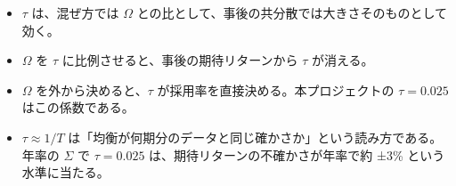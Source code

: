 \begin{keybox}[この章のまとめ]
\begin{itemize}
\item $\tau$ は、混ぜ方では $\Omega$ との比として、事後の共分散では大きさそのものとして効く。
\item $\Omega$ を $\tau$ に比例させると、事後の期待リターンから $\tau$ が消える。
\item $\Omega$ を外から決めると、$\tau$ が採用率を直接決める。本プロジェクトの $\tau=0.025$ はこの係数である。
\item $\tau\approx1/T$ は「均衡が何期分のデータと同じ確かさか」という読み方である。年率の $\Sigma$ で $\tau=0.025$ は、期待リターンの不確かさが年率で約 ±3\% という水準に当たる。
\end{itemize}
\end{keybox}
